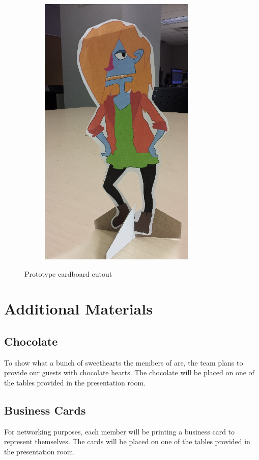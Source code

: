 \documentclass{GlobalDocument}
\begin{document}
\begin{figure}[htb]
	\centering\begin{subfigure}{.45\textwidth}
	\includegraphics{images/cutout}
	\end{subfigure}
	\caption{Prototype cardboard cutout}
	\label{fig:cutout}
\end{figure}

\chapter{Additional Materials}
\section{Chocolate}
To show what a bunch of sweethearts the members of \ourteam{} are, the team plans to provide our guests with chocolate hearts. The chocolate will be placed on one of the tables provided in the presentation room.

\section{Business Cards}
For networking purposes, each member will be printing a business card to represent themselves. The cards will be placed on one of the tables provided in the presentation room.
\end{document}

